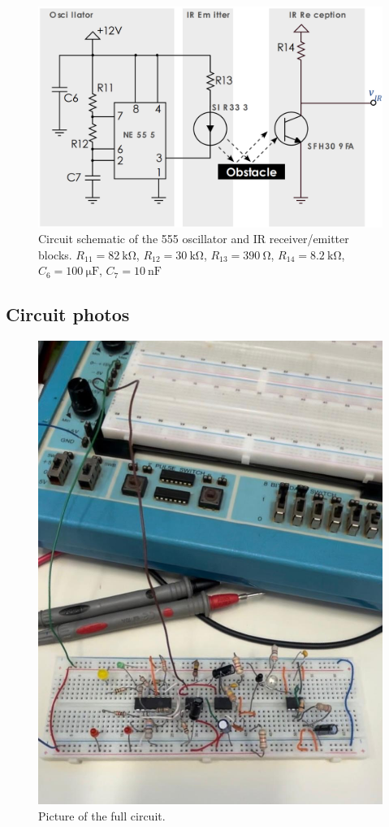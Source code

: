 \documentclass[lettersize,journal]{IEEEtran}
\begin{document}
\begin{figure}[H]
    \centering
    \includegraphics[width=\linewidth]{images/OSCILLATOR_DIAGRAM.png}
    \caption{Circuit schematic of the 555 oscillator and IR receiver/emitter blocks. $R_{11} = \SI{82}{\kilo \ohm}$, $R_{12} = \SI{30}{\kilo \ohm}$, $R_{13} = \SI{390}{\ohm}$, $R_{14} = \SI{8.2}{\kilo \ohm}$, $C_6 = \SI{100}{\micro \farad}$, $C_7 = \SI{10}{\nano \farad}$}
    \label{fig:555IRSCHEME}
\end{figure}



\subsection{Circuit photos}

\begin{figure}[H]
    \centering
    \includegraphics[width=0.7\linewidth]{images/full_circuit.jpeg}
    \caption{Picture of the full circuit.}
    \label{fig:full_circuit}
\end{figure}
\end{document}
